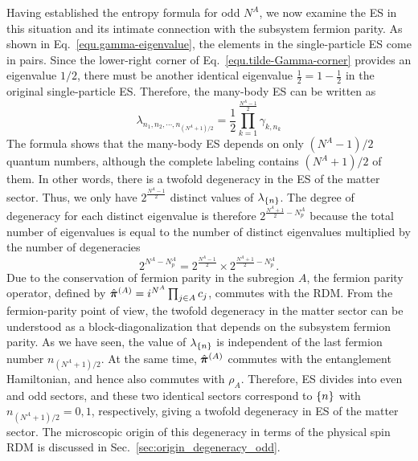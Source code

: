 Having established the entropy formula for odd $N^A$, we now examine the ES in this situation and its intimate connection with the subsystem fermion parity. As shown in Eq.~\eqref{equ.gamma-eigenvalue}, the elements in the single-particle ES come in pairs. Since the lower-right corner of Eq.~\eqref{equ.tilde-Gamma-corner} provides an eigenvalue $1/2$, there must be another identical eigenvalue $\frac{1}{2}=1-\frac{1}{2}$ in the original single-particle ES. Therefore, the many-body ES can be written as 
\begin{equation}\label{equ.many-body-entanglement-spectrum-odd}
\lambda_{n_1,n_2,\cdots,n_{(N^A+1)/2}} = \frac{1}{2}\prod_{k=1}^{\frac{N^A-1}{2}}\gamma_{k,n_k}
\end{equation}
The formula shows that the many-body ES depends on only $(N^A-1)/2$ quantum numbers, although the complete labeling contains $(N^A+1)/2$ of them. In other words, there is a twofold degeneracy in the ES of the matter sector. Thus, we only have $2^{\frac{N^A-1}{2}}$ distinct values of $\lambda_{\left\{ n \right\}}$. The degree of degeneracy for each distinct eigenvalue is therefore $2^{\frac{N^A+1}{2}-N^A_p}$ because the total number of eigenvalues is equal to the number of distinct eigenvalues multiplied by the number of degeneracies
\[
2^{N^A-N^A_p} = 2^{\frac{N^A-1}{2}}\times 2^{\frac{N^A+1}{2}-N^A_p}.
\]
Due to the conservation of fermion parity in the subregion $A$, the fermion parity operator, defined by $\hat{\boldsymbol{\pi}}^{(A)} = i^{N^{A}}\prod_{j\in A}c_j$, commutes with the RDM. From the fermion-parity point of view, the twofold degeneracy in the matter sector can be understood as a block-diagonalization that depends on the subsystem fermion parity. As we have seen, the value of $\lambda_{\left\{ n \right\}}$ is independent of the last fermion number $n_{(N^A+1)/2}$. At the same time, $\hat{\boldsymbol{\pi}}^{(A)}$ commutes with the entanglement Hamiltonian, and hence also commutes with $\rho_A$. Therefore, ES divides into even and odd sectors, and these two identical sectors correspond to $\left\{ n \right\}$ with $n_{(N^A+1)/2}=0,1$, respectively, giving a twofold degeneracy in ES of the matter sector. The microscopic origin of this degeneracy in terms of the physical spin RDM is discussed in Sec.~\ref{sec:origin_degeneracy_odd}.

